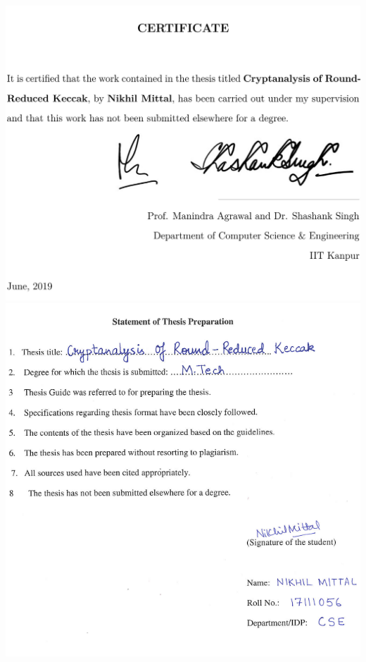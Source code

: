 \newpage
%
\includegraphics[width=\textwidth]{thesis-cer_2.jpg}
\newpage
\includegraphics[width=\textwidth]{statement.png}


